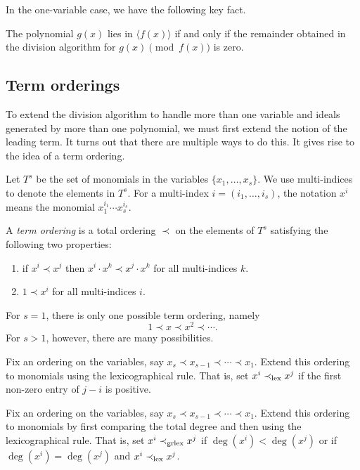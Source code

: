 \documentclass[11pt]{article}
\begin{document}
In the one-variable case, we have the following key fact.
\begin{proposition}
  The polynomial $g(x)$ lies in $\langle  f(x) \rangle$ if and only if the remainder obtained in the division algorithm for $g(x) \pmod {f(x)}$ is zero.
\end{proposition}

\subsection{Term orderings}
To extend the division algorithm to handle more than one variable and ideals generated by more than one polynomial, we must first extend the notion of the leading term.
It turns out that there are multiple ways to do this.
It gives rise to the idea of a term ordering.

Let $T^s$ be the set of monomials in the variables $\{x_1, \dots, x_s\}$.
We use multi-indices to denote the elements in $T^s$.
For a multi-index $i = (i_1, \dots, i_s)$, the notation $x^i$ means the monomial $x_1^{i_1} \cdots x_s^{i_s}$.
\begin{definition}
  A \emph{term ordering} is a total ordering $\prec$ on the elements of $T^s$ satisfying the following two properties:
  \begin{enumerate}
  \item if $x^i \prec x^j$ then $x^i \cdot x^k \prec x^j \cdot x^k$ for all multi-indices $k$.
  \item $1 \prec x^i$ for all multi-indices $i$.
  \end{enumerate}
\end{definition}

For $s = 1$, there is only one possible term ordering, namely \[1 \prec x \prec x^2 \prec \cdots.\]
For $s > 1$, however, there are many possibilities.
\begin{example}
  Fix an ordering on the variables, say $x_s \prec x_{s-1} \prec \cdots \prec x_1$.
  Extend this ordering to monomials using the lexicographical rule.
  That is, set $x^i \prec_{\rm lex} x^j$ if the first non-zero entry of $j-i$ is positive.
\end{example}

\begin{example}
  Fix an ordering on the variables, say $x_s \prec x_{s-1} \prec \cdots \prec x_1$.
  Extend this ordering to monomials by first comparing the total degree and then using the lexicographical rule.
  That is, set $x^i \prec_{\rm grlex} x^j$ if $\deg(x^i) < \deg(x^j)$ or if $\deg(x^i) = \deg(x^j)$ and $x^i \prec_{\rm lex} x^j$.
\end{example}
\end{document}
